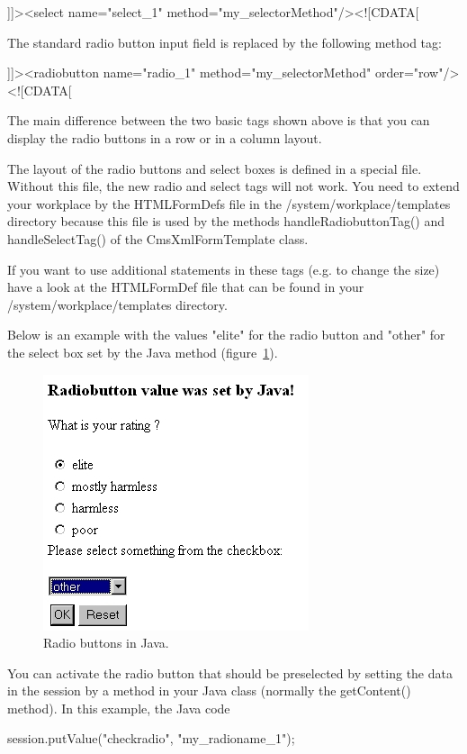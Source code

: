 {\code ]]><select name="select\_1" method="my\_selectorMethod"/><![CDATA[}

The standard radio button input field is replaced by the following
method tag:

{\code ]]><radiobutton name="radio\_1" method="my\_selectorMethod" order="row"/><![CDATA[}

The main difference between the two basic tags shown above is that you
can display the radio buttons in a row or in a column layout.

The layout of the radio buttons and select boxes is defined in a special
file. Without this file, the new radio and select tags will not work.
You need to extend your workplace by the HTMLFormDefs file in the
{\dir /system/workplace/templates} directory because this file is used by the methods
{\tag handleRadiobuttonTag()} and {\tag handleSelectTag()} of the {\class CmsXmlFormTemplate}
class.

If you want to use additional statements in these tags (e.g. to change
the size) have a look at the HTMLFormDef file that can be found in your
{\dir /system/workplace/templates} directory.

Below is an example with the values "elite" for the radio button and
"other" for the select box set by the Java method (figure~\ref{RadioButtons}).

\begin{figure}
\begin{center}
\includegraphics[clip,width=0.4\linewidth]{pics/modules/47}
\end{center}
\caption[Radio buttons in Java]{Radio buttons in Java.}
\label{RadioButtons}
\end{figure}

You can activate the radio button that should be preselected by setting
the data  in the session by a method in your Java class (normally the
{\meth getContent()} method). In this example, the Java code 

\begin{java}
{\code session.putValue("checkradio", "my\_radioname\_1")};
\end{java}

